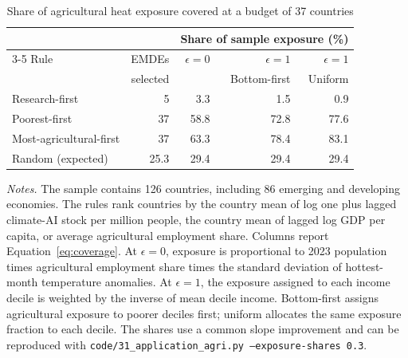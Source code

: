 \begin{table}[htbp]
\centering
\caption{Share of agricultural heat exposure covered at a budget of 37 countries}
\label{tab:coverage}
\small
\begin{tabular}{lrrrr}
\toprule
 & & \multicolumn{3}{c}{Share of sample exposure (\%)}\\
\cmidrule(lr){3-5}
Rule & EMDEs & $\epsilon=0$ & $\epsilon=1$ & $\epsilon=1$\\
 & selected & & Bottom-first & Uniform\\
\midrule
Research-first          &  5 &  3.3 &  1.5 &  0.9 \\
Poorest-first           & 37 & 58.8 & 72.8 & 77.6 \\
Most-agricultural-first & 37 & 63.3 & 78.4 & 83.1 \\
Random (expected)       & 25.3 & 29.4 & 29.4 & 29.4 \\
\bottomrule
\end{tabular}
\begin{minipage}{0.95\textwidth}\footnotesize\smallskip
\emph{Notes.} The sample contains 126 countries, including 86 emerging and developing
economies. The rules rank countries by the country mean of log one
plus lagged climate-AI stock per million people, the country mean of lagged log GDP per capita,
or average agricultural employment share. Columns report
Equation~\eqref{eq:coverage}. At $\epsilon=0$, exposure is proportional to 2023 population
times agricultural employment share times the standard deviation of hottest-month
temperature anomalies. At $\epsilon=1$, the exposure assigned to each income decile
is weighted by the inverse of mean decile income. Bottom-first assigns agricultural
exposure to poorer deciles first; uniform allocates the same exposure fraction to
each decile. The shares use a common slope improvement and can be reproduced with
\texttt{code/31\_application\_agri.py --exposure-shares 0.3}.
\end{minipage}
\end{table}
